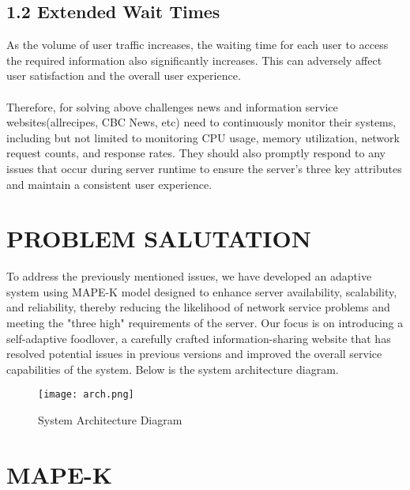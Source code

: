 \documentclass[sigconf]{acmart}
\begin{document}
\subsection*{1.2 Extended Wait Times}
As the volume of user traffic increases, the waiting time for each user to access the required 
information also significantly increases. This can adversely affect user satisfaction and the 
overall user experience.
\\
\\
Therefore, for solving above challenges news and information service websites(allrecipes, CBC News, etc) 
need to continuously monitor their systems, including but not limited to monitoring CPU usage, 
memory utilization, network request counts, and response rates. 
They should also promptly respond to any issues that occur during server runtime to 
ensure the server's three key attributes and maintain a consistent user experience.
\section{PROBLEM SALUTATION}
To address the previously mentioned issues, we have developed an adaptive 
system using MAPE-K model\cite{IglesiaDidacGilDeLa2015MFTt} designed to enhance server availability, scalability, and reliability, 
thereby reducing the likelihood of network service problems and meeting the "three high"
requirements of the server. Our focus is on introducing a self-adaptive foodlover, 
a carefully crafted information-sharing website that has resolved potential issues 
in previous versions and improved the overall service capabilities of the system.
Below is the system architecture diagram.
\begin{figure}[H]
  \begin{minipage}{0.5\textwidth}
    \centering
    \texttt{[image: arch.png]}
    \caption{System Architecture Diagram}
    \label{fig:architecture}
  \end{minipage}
\end{figure}
\section{MAPE-K}
\end{document}
